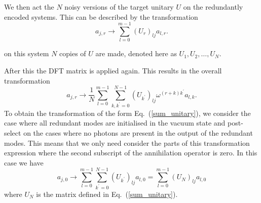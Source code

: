 \documentclass[aps,pra,twocolumn,superscriptaddress,numerical]{revtex4-1}
\begin{document}
We then act the $N$ noisy versions of the target unitary $U$ on the redundantly encoded systems.  This can be described by the transformation
\begin{equation}
	a_{j,r} \rightarrow \sum_{l=0}^{m-1} (U_r)_{lj} a_{l,r}.
\end{equation}

on this system $N$ copies of $U$ are made, denoted here as $U_1, U_2, \ldots, U_N$. 

After this the DFT matrix is applied again.  This results in the overall transformation
\begin{equation}
	a_{j,r} \rightarrow \frac{1}{N} 
	\sum_{l=0}^{m-1} \sum_{k,k^\prime=0}^{N-1}
	(U_{k^\prime})_{lj} \omega^{(r+k)k^\prime} a_{l,k}.
\end{equation}
To obtain the transformation of the form Eq.~(\ref{sum_unitary}), we consider the case where all redundant modes are initialised in the vacuum state and post-select on the cases where no photons are present in the output of the redundant modes.  This means that we only need consider the parts of this transformation expression where the second subscript of the annihilation operator is zero.  In this case we have
\begin{equation}
	\label{sum_transformation}
	a_{j,0} \rightarrow \sum_{l=0}^{m-1} \sum_{k^\prime=0}^{N-1}
	(U_{k^\prime})_{lj} a_{l,0} = \sum_{l=0}^{m-1} (U_N)_{lj} a_{l,0}
\end{equation}
where $U_N$ is the matrix defined in Eq.~(\ref{sum_unitary}).
\end{document}
